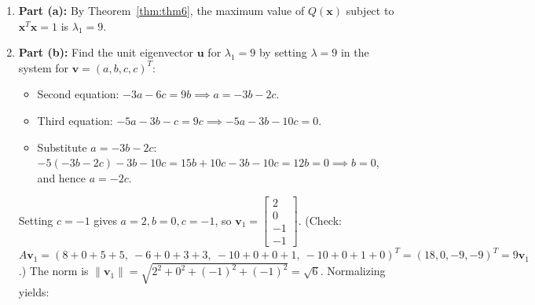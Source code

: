 \documentclass[11pt, letterpaper]{article}
\theoremstyle{definition}
\theoremstyle{remark}
\begin{document}
\begin{enumerate}[leftmargin=2em]
\[    \]
    Let us compute $\det(M - \lambda I) = 0$ by expanding along the first row:
    \begin{align*}
    \det \begin{bmatrix} 4 - \lambda & -3 & -10 \\ -3 & -\lambda & -6 \\ -5 & -3 & -1 - \lambda \end{bmatrix}
    &= (4 - \lambda)[\lambda(1 + \lambda) - 18] + 3[3(1 + \lambda) - 30] - 10[9 - 5\lambda] \\
    &= (4 - \lambda)(\lambda^2 + \lambda - 18) + (9\lambda - 81) - 90 + 50\lambda \\
    &= (-\lambda^3 + 3\lambda^2 + 22\lambda - 72) + 59\lambda - 171 \\
    &= -\lambda^3 + 3\lambda^2 + 81\lambda - 243 \\
    &= -\lambda^2(\lambda - 3) + 81(\lambda - 3) \\
    &= -(\lambda - 3)(\lambda^2 - 81) = -(\lambda - 9)(\lambda - 3)(\lambda + 9) = 0.
    \end{align*}
    Thus, the four exact eigenvalues of $A$ in descending order are:
    \[
    \lambda_1 = 9, \qquad \lambda_2 = 3, \qquad \lambda_3 = 1, \qquad \lambda_4 = -9.
    \]
    (Trace check: $9 + 3 + 1 + (-9) = 4 = \operatorname{tr}(A)$.)
    \item \textbf{Part (a):} By Theorem~\ref{thm:thm6}, the maximum value of $Q(\mathbf{x})$ subject to $\mathbf{x}^T \mathbf{x} = 1$ is $\lambda_1 = 9$.
    \item \textbf{Part (b):} Find the unit eigenvector $\mathbf{u}$ for $\lambda_1 = 9$ by setting $\lambda = 9$ in the system for $\mathbf{v} = (a, b, c, c)^T$:
    \begin{itemize}
        \item Second equation: $-3a - 6c = 9b \implies a = -3b - 2c$.
        \item Third equation: $-5a - 3b - c = 9c \implies -5a - 3b - 10c = 0$.
        \item Substitute $a = -3b - 2c$: $-5(-3b - 2c) - 3b - 10c = 15b + 10c - 3b - 10c = 12b = 0 \implies b = 0$, and hence $a = -2c$.
    \end{itemize}
    Setting $c = -1$ gives $a = 2, b = 0, c = -1$, so $\mathbf{v}_1 = \begin{bmatrix} 2 \\ 0 \\ -1 \\ -1 \end{bmatrix}$. (Check: $A\mathbf{v}_1 = (8+0+5+5,\ -6+0+3+3,\ -10+0+0+1,\ -10+0+1+0)^T = (18, 0, -9, -9)^T = 9\mathbf{v}_1$.) The norm is $\|\mathbf{v}_1\| = \sqrt{2^2 + 0^2 + (-1)^2 + (-1)^2} = \sqrt{6}$. Normalizing yields:

\end{enumerate}
\end{document}
